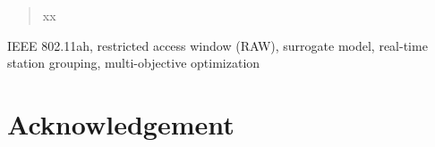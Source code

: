\documentclass[review, 3p, 11pt]{elsarticle}
\begin{document}
\begin{frontmatter}

\begin{abstract}
xx
\end{abstract}

\begin{keyword}
IEEE 802.11ah, restricted access window (RAW), surrogate model, real-time station grouping, multi-objective optimization
\end{keyword}


\end{frontmatter}

\linenumbers

\glsresetall





%






\section*{Acknowledgement}


%
%


%   





\end{document}
